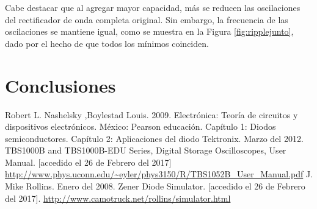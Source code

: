 \documentclass[twoside,twocolumn,a4paper]{article}
\begin{document}
Cabe destacar que al agregar mayor capacidad, m\'as se reducen las oscilaciones del rectificador de onda completa original. Sin embargo, la frecuencia de las oscilaciones se mantiene igual, como se muestra en la Figura \ref{fig:ripplejunto}, dado por el hecho de que todos los m\'inimos coinciden. 



\section{Conclusiones}



\begin{thebibliography}{99} %

 Robert L. Nashelsky ,Boylestad Louis. 2009. Electr\'onica: Teor\'ia de circuitos y dispositivos electr\'onicos. M\'exico: Pearson educaci\'on. Cap\'itulo 1: Diodos semiconductores. Cap\'itulo 2: Aplicaciones del diodo 
 Tektronix. Marzo del 2012. TBS1000B and TBS1000B-EDU Series, Digital Storage Oscilloscopes, User Manual. [accedido el 26 de Febrero del 2017] \url{http://www.phys.uconn.edu/~eyler/phys3150/R/TBS1052B_User_Manual.pdf}
 J. Mike Rollins. Enero del 2008. Zener Diode Simulator. [accedido el 26 de Febrero del 2017]. \url{http://www.camotruck.net/rollins/simulator.html}
 
\end{thebibliography}

\end{document}
